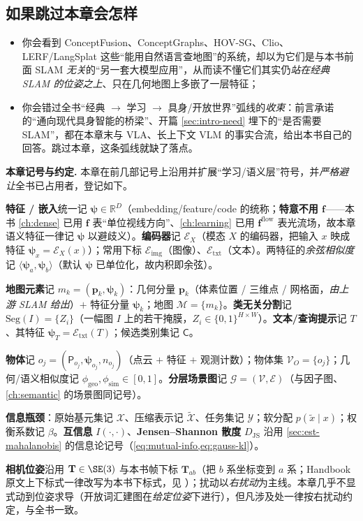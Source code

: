 \subsection*{如果跳过本章会怎样}
\begin{itemize}
  \item 你会看到 ConceptFusion、ConceptGraphs、HOV-SG、Clio、LERF/LangSplat 这些“能用自然语言查地图”的系统，却以为它们是与本书前面 SLAM \emph{无关}的“另一套大模型应用”，从而读不懂它们其实仍\emph{站在经典 SLAM 的位姿之上}、只在几何地图上多嵌了一层特征；
  \item 你会错过全书“经典 $\to$ 学习 $\to$ 具身/开放世界”弧线的\emph{收束}：前言承诺的“通向现代具身智能的桥梁”、开篇 \cref{sec:intro-need} 埋下的“是否需要 SLAM”，都在本章末与 VLA、长上下文 VLM 的事实合流，给出本书自己的回答。跳过本章，这条弧线就缺了落点。
\end{itemize}

\begin{note}
\textbf{本章记号与约定.}\;
本章在前几部记号上沿用并扩展“学习/语义层”符号，并\emph{严格避让}全书已占用者，登记如下。

\textbf{特征 / 嵌入}统一记 $\boldsymbol\psi\in\mathbb{R}^{D}$（embedding/feature/code 的统称；\textbf{特意不用 $\mathbf{f}$}——本书 \cref{ch:dense} 已用 $\mathbf{f}$ 表“单位视线方向”、\cref{ch:learning} 已用 $\mathbf{f}^{\mathrm{flow}}$ 表光流场，故本章语义特征一律记 $\boldsymbol\psi$ 以避歧义）。\textbf{编码器}记 $\mathcal{E}_{X}$（模态 $X$ 的编码器，把输入 $x$ 映成特征 $\boldsymbol\psi_x=\mathcal{E}_X(x)$）；常用下标 $\mathcal{E}_{\mathrm{img}}$（图像）、$\mathcal{E}_{\mathrm{txt}}$（文本）。两特征的\emph{余弦相似度}记 $\langle\boldsymbol\psi_a,\boldsymbol\psi_b\rangle$（默认 $\boldsymbol\psi$ 已单位化，故内积即余弦）。

\textbf{地图元素}记 $m_k=(\mathbf{p}_k,\boldsymbol\psi_k)$：几何分量 $\mathbf{p}_k$（体素位置 / 三维点 / 网格面，\emph{由上游 SLAM 给出}）$+$ 特征分量 $\boldsymbol\psi_k$；地图 $\mathcal{M}=\{m_k\}$。\textbf{类无关分割}记 $\mathrm{Seg}(I)=\{Z_i\}$（一幅图 $I$ 上的若干掩膜，$Z_i\in\{0,1\}^{H\times W}$）。\textbf{文本/查询提示}记 $T$、其特征 $\boldsymbol\psi_T=\mathcal{E}_{\mathrm{txt}}(T)$；候选类别集记 $\mathsf{C}$。

\textbf{物体}记 $o_j=(\mathsf{P}_{o_j},\boldsymbol\psi_{o_j},n_{o_j})$（点云 $+$ 特征 $+$ 观测计数）；物体集 $\mathcal{V}_O=\{o_j\}$；几何/语义相似度记 $\phi_{\mathrm{geo}},\phi_{\mathrm{sim}}\in[0,1]$。\textbf{分层场景图}记 $\mathcal{G}=(\mathcal{V},\mathcal{E})$（与因子图、\cref{ch:semantic} 的场景图同记号）。

\textbf{信息瓶颈}：原始基元集记 $\mathcal{X}$、压缩表示记 $\tilde{\mathcal{X}}$、任务集记 $\mathcal{Y}$；软分配 $p(\tilde{x}\mid x)$；权衡系数记 $\beta$。\textbf{互信息} $I(\cdot,\cdot)$、\textbf{Jensen--Shannon 散度} $D_{\mathrm{JS}}$ 沿用 \cref{sec:est-mahalanobis} 的信息论记号（\cref{eq:mutual-info,eq:gauss-kl}）。

\textbf{相机位姿}沿用 $\mathbf{T}\in\SE(3)$ 与本书帧下标 $\mathbf{T}_{ab}$（把 $b$ 系坐标变到 $a$ 系；Handbook 原文上下标式一律改写为本书下标式，见 ）；扰动以\emph{右扰动}为主线。本章几乎不显式动到位姿求导（开放词汇建图在\emph{给定位姿}下进行），但凡涉及处一律按右扰动约定，与全书一致。
\end{note}

